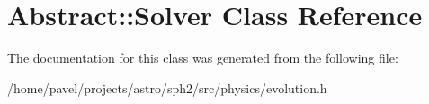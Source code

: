 \hypertarget{classAbstract_1_1Solver}{}\section{Abstract\+:\+:Solver Class Reference}
\label{classAbstract_1_1Solver}


The documentation for this class was generated from the following file\+:\begin{DoxyCompactItemize}
\item 
/home/pavel/projects/astro/sph2/src/physics/evolution.\+h\end{DoxyCompactItemize}
